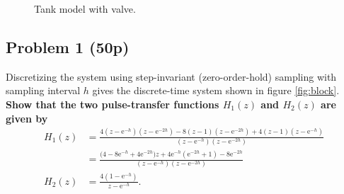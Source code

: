 \documentclass[letter,12pt]{scrartcl}
\newcommand*{\mexp}[1]{\ensuremath{\mathrm{e}^{#1}}}
\begin{document}
\begin{figure}[h]
\begin{center}
    \caption{Tank model with valve.}
    \label{fig:tank}
  \end{center}
\end{figure}
\clearpage
\subsection*{Problem 1 (50p)}

Discretizing the system using step-invariant (zero-order-hold) sampling with sampling interval $h$ gives the discrete-time system shown in figure \ref{fig:block}. \textbf{Show that the two pulse-transfer functions \(H_1(z)\) and \(H_2(z)\) are given by}
   \begin{align*}
   H_1(z) &= \frac{4(z-\mexp{-h})(z-\mexp{-2h}) - 8(z-1)(z-\mexp{-2h}) + 4(z-1)(z-\mexp{-h})}{(z-\mexp{-h})(z-\mexp{-2h})}\\
        &= \frac{ \big( 4 - 8\mexp{-h} +4\mexp{-2h}\big) z + 4\mexp{-h}(\mexp{-2h} +1 ) -8\mexp{-2h}}{(z-\mexp{-h})(z-\mexp{-2h})}\\
   H_2(z) &= \frac{4(1-\mexp{-h})}{z-\mexp{-h}}.
   \end{align*}
   
\end{document}
